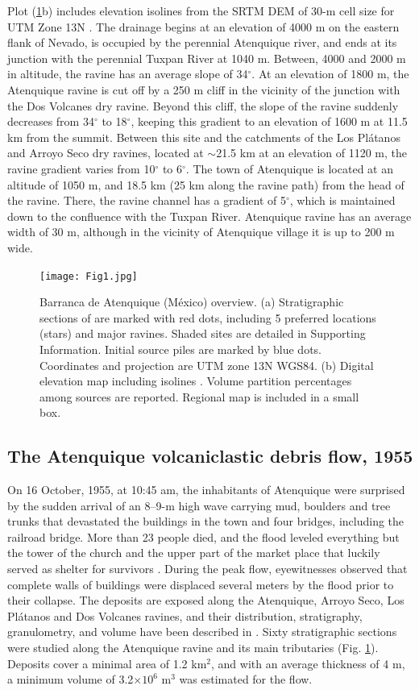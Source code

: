 \documentclass[nhess, manuscript]{copernicus}
\begin{document}
Plot (\ref{Fig1}b) includes elevation isolines from the SRTM DEM of 30-m cell size for UTM Zone 13N \citep{NASA2014}. The drainage begins at an elevation of 4000 m on the eastern flank of Nevado, is occupied by the perennial Atenquique river, and ends at its junction with the perennial Tuxpan River at 1040 m. Between, 4000 and 2000 m in altitude, the ravine has an average slope of 34$^\circ$. At an elevation of 1800 m, the Atenquique ravine is cut off by a 250 m cliff in the vicinity of the junction with the Dos Volcanes dry ravine. Beyond this cliff, the slope of the ravine suddenly decreases from 34$^\circ$ to 18$^\circ$, keeping this gradient to an elevation of 1600 m at 11.5 km from the summit. Between this site and the catchments of the Los Pl\'atanos and Arroyo Seco dry ravines, located at $\sim$21.5 km at an elevation of 1120 m, the ravine gradient varies from 10$^\circ$ to 6$^\circ$. The town of Atenquique is located at an altitude of 1050 m, and 18.5 km (25 km along the ravine path) from the head of the ravine. There, the ravine channel has a gradient of 5$^\circ$, which is maintained down to the confluence with the Tuxpan River. Atenquique ravine has an average width of 30 m, although in the vicinity of Atenquique village it is up to 200 m wide.

\begin{figure}[H]
\centering
\texttt{[image: Fig1.jpg]}
\caption{Barranca de Atenquique (M{\'e}xico) overview. (a) Stratigraphic sections of \citep{Saucedo2008} are marked with red dots, including 5 preferred locations (stars) and major ravines. Shaded sites are detailed in Supporting Information. Initial source piles are marked by blue dots. Coordinates and projection are UTM zone 13N WGS84. (b) Digital elevation map including isolines \citep{NASA2014}. Volume partition percentages among sources are reported. Regional map is included in a small box.}
\label{Fig1}
\end{figure}

\subsection{The Atenquique volcaniclastic debris flow, 1955}
On 16 October, 1955, at 10:45 am, the inhabitants of Atenquique were surprised by the sudden arrival of an 8--9-m high wave carrying mud, boulders and tree trunks that devastated the buildings in the town and four bridges, including the railroad bridge. More than 23 people died, and the flood leveled everything but the tower of the church and the upper part of the market place that luckily served as shelter for survivors \citep{PonceSegura1983, Saucedo2008}. During the peak flow, eyewitnesses observed that complete walls of buildings were displaced several meters by the flood prior to their collapse. The deposits are exposed along the Atenquique, Arroyo Seco, Los Pl\'atanos and Dos Volcanes ravines, and their distribution, stratigraphy, granulometry, and volume have been  described in \cite{Saucedo2008}. Sixty stratigraphic sections were studied along the Atenquique ravine and its main tributaries  (Fig. \ref{Fig1}). Deposits cover a minimal area of 1.2 km$^2$, and with an average thickness of 4 m, a minimum volume of 3.2$\times10^6$ m$^3$ was estimated for the flow.
\end{document}
